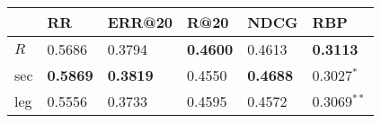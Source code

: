 \begin{tabular}{llllll}
\toprule
{} &               RR &           ERR@20 &           R@20 &             NDCG &              RBP \\
\midrule
$R$ &           0.5686 &           0.3794 &\textbf{0.4600} &           0.4613 &  \textbf{0.3113} \\
sec &  \textbf{0.5869} &  \textbf{0.3819} &         0.4550 &  \textbf{0.4688} &     0.3027$^{*}$ \\
leg &           0.5556 &           0.3733 &         0.4595 &           0.4572 &    0.3069$^{**}$ \\
\bottomrule
\end{tabular}
